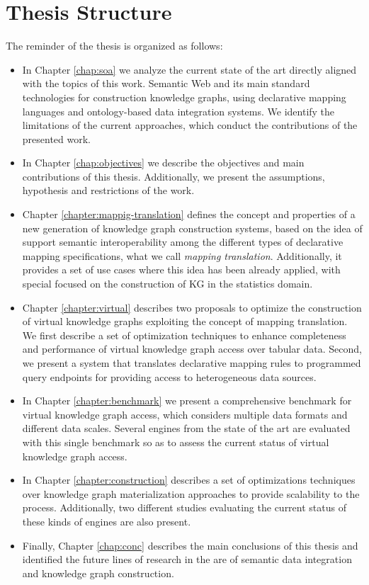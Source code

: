 \section{Thesis Structure}
\label{sec:thesisstructure}
The reminder of the thesis is organized as follows:
\begin{itemize}
    \item In Chapter \ref{chap:soa} we analyze the current state of the art directly aligned with the topics of this work. Semantic Web and its main standard technologies for construction knowledge graphs, using declarative mapping languages and ontology-based data integration systems. We identify the limitations of the current approaches, which conduct the contributions of the presented work.
    \item In Chapter \ref{chap:objectives} we describe the objectives and main contributions of this thesis. Additionally, we present the assumptions, hypothesis and restrictions of the work.
    \item Chapter \ref{chapter:mappig-translation} defines the concept and properties of a new generation of knowledge graph construction systems, based on the idea of support semantic interoperability among the different types of declarative mapping specifications, what we call \textit{mapping translation}. Additionally, it provides a set of use cases where this idea has been already applied, with special focused on the construction of KG in the statistics domain.
    \item Chapter \ref{chapter:virtual} describes two proposals to optimize the construction of virtual knowledge graphs exploiting the concept of mapping translation. We first describe a set of optimization techniques to enhance completeness and performance of virtual knowledge graph access over tabular data. Second, we present a system that translates declarative mapping rules to programmed query endpoints for providing access to heterogeneous data sources.
    \item In Chapter \ref{chapter:benchmark} we present a comprehensive benchmark for virtual knowledge graph access, which considers multiple data formats and different data scales. Several engines from the state of the art are evaluated with this single benchmark so as to assess the current status of virtual knowledge graph access.
    \item In Chapter \ref{chapter:construction} describes a set of optimizations techniques over knowledge graph materialization approaches to provide scalability to the process. Additionally, two different studies evaluating the current status of these kinds of engines are also present.
    \item Finally, Chapter \ref{chap:conc} describes the main conclusions of this thesis and identified the future lines of research in the are of semantic data integration and knowledge graph construction.
\end{itemize}


